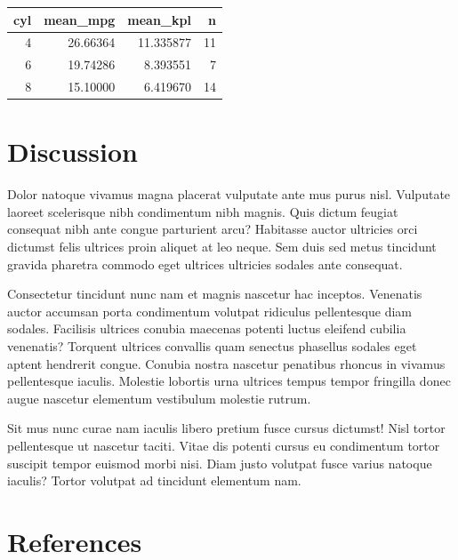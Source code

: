 \documentclass[
  man]{apa6}
\begin{document}
\begin{tabular}{r|r|r|r}
\hline
cyl & mean\_mpg & mean\_kpl & n\\
\hline
4 & 26.66364 & 11.335877 & 11\\
\hline
6 & 19.74286 & 8.393551 & 7\\
\hline
8 & 15.10000 & 6.419670 & 14\\
\hline
\end{tabular}

\hypertarget{discussion}{%
\section{Discussion}\label{discussion}}

Dolor natoque vivamus magna placerat vulputate ante mus purus nisl. Vulputate laoreet scelerisque nibh condimentum nibh magnis. Quis dictum feugiat consequat nibh ante congue parturient arcu? Habitasse auctor ultricies orci dictumst felis ultrices proin aliquet at leo neque. Sem duis sed metus tincidunt gravida pharetra commodo eget ultrices ultricies sodales ante consequat.

Consectetur tincidunt nunc nam et magnis nascetur hac inceptos. Venenatis auctor accumsan porta condimentum volutpat ridiculus pellentesque diam sodales. Facilisis ultrices conubia maecenas potenti luctus eleifend cubilia venenatis? Torquent ultrices convallis quam senectus phasellus sodales eget aptent hendrerit congue. Conubia nostra nascetur penatibus rhoncus in vivamus pellentesque iaculis. Molestie lobortis urna ultrices tempus tempor fringilla donec augue nascetur elementum vestibulum molestie rutrum.

Sit mus nunc curae nam iaculis libero pretium fusce cursus dictumst! Nisl tortor pellentesque ut nascetur taciti. Vitae dis potenti cursus eu condimentum tortor suscipit tempor euismod morbi nisi. Diam justo volutpat fusce varius natoque iaculis? Tortor volutpat ad tincidunt elementum nam.

\newpage

\hypertarget{references}{%
\section{References}\label{references}}

\begingroup
\setlength{\parindent}{-0.5in}
\setlength{\leftskip}{0.5in}
\end{document}
